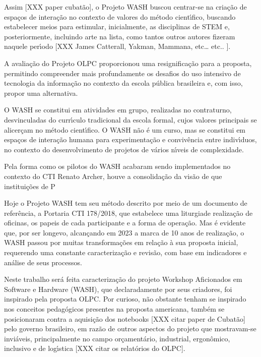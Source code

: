 \documentclass[
12pt,		%
openright,	%
twoside,  %
a4paper,			%
chapter=TITLE,		%
english,			%
french,				%
spanish,			%
brazil				%
]{USPSC-classe/USPSC}
\begin{document}
Assim [XXX paper cubat\~ao], o Projeto WASH buscou centrar-se na cria\c{c}\~ao de espa\c{c}os de intera\c{c}\~ao no contexto de valores do m\'etodo cient\'{\i}fico, buscando estabelecer meios para estimular, inicialmente, as disciplinas de STEM e, posteriormente, incluindo arte na lista, como tantos outros autores fizeram naquele per\'{\i}odo [XXX James Catterall, Yakman, Mammana, etc… etc.. ].


A avalia\c{c}\~ao do Projeto OLPC proporcionou uma resignifica\c{c}\~ao para a proposta, permitindo compreender mais profundamente os desafios do uso intensivo de tecnologia da informa\c{c}\~ao no contexto da escola p\'ublica brasileira e, com isso, propor uma alternativa.


O WASH se constitui em atividades em grupo, realizadas no contraturno, desvinculadas do curr\'{\i}culo tradicional da escola formal, cujos valores principais se alicer\c{c}am no m\'etodo cient\'{\i}fico. O WASH n\~ao \'e um curso, mas se constitui em espa\c{c}os de intera\c{c}\~ao humana para experimenta\c{c}\~ao e conviv\^encia entre indiv\'{\i}duos, no contexto do desenvolvimento de projetos de v\'arios n\'{\i}veis de complexidade.


Pela forma como os pilotos do WASH acabaram sendo implementados no contexto do CTI Renato Archer, houve a consolida\c{c}\~ao da vis\~ao de que institui\c{c}\~oes de P


Hoje o Projeto WASH tem seu m\'etodo descrito por meio de um documento de refer\^encia, a Portaria CTI 178/2018, que estabelece uma \textquotedbl liturgia de realiza\c{c}\~ao de oficinas, os papeis de cada participante e a forma de opera\c{c}\~ao. Mas \'e evidente que, por ser longevo, alcan\c{c}ando em 2023 a marca de 10 anos de realiza\c{c}\~ao, o WASH passou por muitas transforma\c{c}\~oes em rela\c{c}\~ao \`a sua proposta inicial, requerendo uma constante caracteriza\c{c}\~ao e revis\~ao, com base em indicadores e an\'alise de seus processos.


Neste trabalho ser\'a feita caracteriza\c{c}\~ao do projeto Workshop Aficionados em Software e Hardware (WASH), que declaradamente por seus criadores, foi inspirado pela proposta OLPC. Por curioso, n\~ao obstante tenham se inspirado nos conceitos pedag\'ogicos presentes na proposta americana, tamb\'em se posicionaram contra a aquisi\c{c}\~ao dos notebooks [XXX citar paper de Cubat\~ao] pelo governo brasileiro, em raz\~ao de outros aspectos do projeto que mostravam-se invi\'aveis, principalmente no campo or\c{c}ament\'ario, industrial, ergon\^omico, inclusivo e de log\'{\i}stica [XXX citar os relat\'orios do OLPC].
\end{document}
